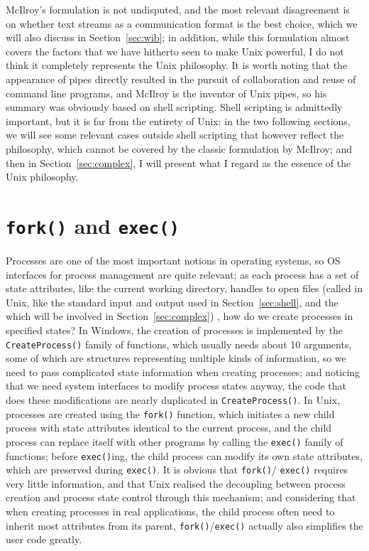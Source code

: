McIlroy's formulation is not undisputed, and the most relevant disagreement is
on whether text streams as a communication format is the best choice, which we
will also discuss in Section~\ref{sec:wib}; in addition, while this formulation
almost covers the factors that we have hitherto seen to make Unix powerful,
I do not think it completely represents the Unix philosophy.  It is worth
noting that the appearance of pipes directly resulted in the pursuit of
collaboration and reuse of command line programs, and
McIlroy is the inventor of Unix pipes, so his summary was obviously based on
shell scripting.  Shell scripting is admittedly important, but it is far
from the entirety of Unix: in the two following sections, we will see
some relevant cases outside shell scripting that however reflect the
philosophy, which cannot be covered by the classic formulation by
McIlroy; and then in Section~\ref{sec:complex}, I will present
what I regard as the essence of the Unix philosophy.

\section{\texttt{fork()} and \texttt{exec()}}\label{sec:exec}

Processes are one of the most important notions in operating systems, so OS
interfaces for process management are quite relevant; as each process has a
set of state attributes, like the current working directory, handles to open
files (called  in Unix, like the standard input and
output used in Section~\ref{sec:shell}, and the 
which will be involved in Section~\ref{sec:complex}) \etc, how do we create
processes in specified states?  In Windows, the creation of processes is
implemented by the \verb|CreateProcess()| family of functions, which usually
needs about 10 arguments, some of which are structures representing multiple
kinds of information, so we need to pass complicated state information when
creating processes; and noticing that we need system interfaces to modify
process states anyway, the code that does these modifications are nearly
duplicated in \verb|CreateProcess()|.  In Unix, processes are created using
the \verb|fork()| function, which initiates a new child process with state
attributes identical to the current process, and the child process can replace
itself with other programs by calling the \verb|exec()| family of functions;
before \verb|exec()|ing, the child process can modify its own state attributes,
which are preserved during \verb|exec()|.  It is obvious that \verb|fork()|/%
\verb|exec()| requires very little information, and that Unix realised the
decoupling between process creation and process state control through this
mechanism; and considering that when creating processes in real applications,
the child process often need to inherit most attributes from its parent,
\verb|fork()|/\verb|exec()| actually also simplifies the user code greatly.

